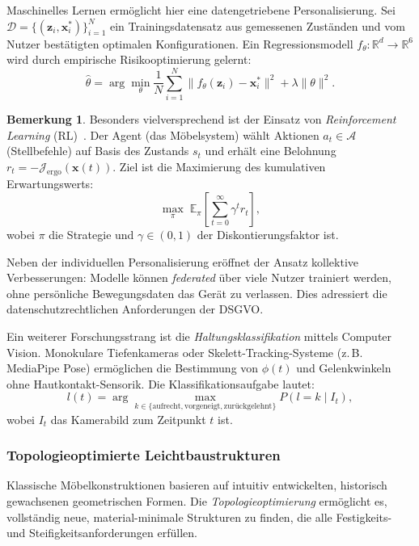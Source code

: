 ﻿\documentclass[a4paper,12pt]{article}
\theoremstyle{definition}
\newtheorem{bemerkung}{Bemerkung}
\begin{document}
Maschinelles Lernen erm\"{o}glicht hier eine datengetriebene Personalisierung.
Sei $\mathcal{D} = \{(\mathbf{z}_i, \mathbf{x}_i^*)\}_{i=1}^N$ ein
Trainingsdatensatz aus gemessenen Zust\"{a}nden und vom Nutzer best\"{a}tigten optimalen
Konfigurationen. Ein Regressionsmodell $f_\theta\colon \mathbb{R}^d \to \mathbb{R}^6$
wird durch empirische Risikooptimierung gelernt:
\[
	\hat\theta = \arg\min_\theta \frac{1}{N}\sum_{i=1}^N
	\bigl\| f_\theta(\mathbf{z}_i) - \mathbf{x}_i^*\bigr\|^2 + \lambda\|\theta\|^2.
\]

\begin{bemerkung}
	Besonders vielversprechend ist der Einsatz von \emph{Reinforcement Learning} (RL)~\cite{SuttonBarto2018}.
	Der Agent (das M\"{o}belsystem) w\"{a}hlt Aktionen $a_t \in \mathcal{A}$ (Stellbefehle)
	auf Basis des Zustands $s_t$ und erh\"{a}lt eine Belohnung
	$r_t = -\mathcal{J}_{\mathrm{ergo}}(\mathbf{x}(t))$.
	Ziel ist die Maximierung des kumulativen Erwartungswerts:
	\[
		\max_\pi \;\mathbb{E}_\pi\!\left[\sum_{t=0}^\infty \gamma^t r_t\right],
	\]
	wobei $\pi$ die Strategie und $\gamma \in (0, 1)$ der Diskontierungsfaktor ist.
\end{bemerkung}

Neben der individuellen Personalisierung er\"{o}ffnet der Ansatz kollektive
Verbesserungen: Modelle k\"{o}nnen \emph{federated} \"{u}ber viele Nutzer trainiert werden,
ohne pers\"{o}nliche Bewegungsdaten das Ger\"{a}t zu verlassen. Dies adressiert die
datenschutzrechtlichen Anforderungen der DSGVO.

Ein weiterer Forschungsstrang ist die \emph{Haltungsklassifikation} mittels
Computer Vision. Monokulare Tiefenkameras oder Skelett-Tracking-Systeme
(z.\,B. MediaPipe Pose) erm\"{o}glichen die Bestimmung von $\phi(t)$ und
Gelenkwinkeln ohne Hautkontakt-Sensorik. Die Klassifikationsaufgabe lautet:
\[
	l(t) = \arg\max_{k \in \{\text{aufrecht}, \text{vorgeneigt}, \text{zur\"{u}ckgelehnt}\}}
	P(l = k \mid I_t),
\]
wobei $I_t$ das Kamerabild zum Zeitpunkt $t$ ist.

\subsubsection{Topologieoptimierte Leichtbaustrukturen}

Klassische M\"{o}belkonstruktionen basieren auf intuitiv entwickelten, historisch
gewachsenen geometrischen Formen. Die \emph{Topologieoptimierung} erm\"{o}glicht es,
vollst\"{a}ndig neue, material-minimale Strukturen zu finden, die alle
Festigkeits- und Steifigkeitsanforderungen erf\"{u}llen.
\end{document}
